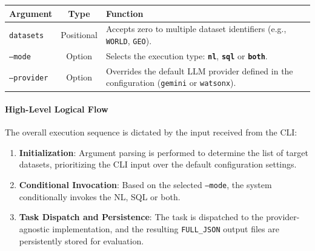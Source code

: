 \begin{table}[h]
    \centering
    \label{tab:cli-arguments}
    \begin{tabular}{l c p{11cm}} 
        \toprule
        \textbf{Argument} & \textbf{Type} & \textbf{Function} \\
        \midrule
        \texttt{datasets} & Positional & Accepts zero to multiple dataset identifiers (e.g., \texttt{WORLD}, \texttt{GEO}). \\
        \texttt{--mode} & Option & Selects the execution type: \textbf{\texttt{nl}}, \textbf{\texttt{sql}} or \textbf{\texttt{both}}. \\
        \texttt{--provider} & Option & Overrides the default LLM provider defined in the configuration (\texttt{gemini} or \texttt{watsonx}). \\
        \bottomrule
    \end{tabular}
\end{table}
\paragraph{\textbf{High-Level Logical Flow}}
The overall execution sequence is dictated by the input received from the CLI:
\begin{enumerate}[leftmargin=*, label=\arabic*.]
    \item \textbf{Initialization}: Argument parsing is performed to determine the list of target datasets, prioritizing the CLI input over the default configuration settings.
    \item \textbf{Conditional Invocation}: Based on the selected \texttt{--mode}, the system conditionally invokes the NL, SQL or both.
    \item \textbf{Task Dispatch and Persistence}: The task is dispatched to the provider-agnostic implementation, and the resulting \texttt{FULL\_JSON} output files are persistently stored for evaluation.
\end{enumerate}